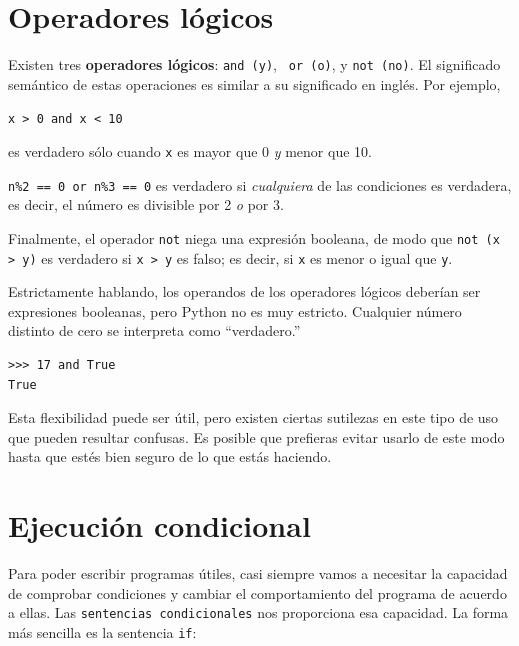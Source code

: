 

\section {Operadores lógicos}

Existen tres {\bf operadores lógicos}: {\tt and (y)}, {\tt
or (o)}, y {\tt not (no)}. El significado semántico de estas operaciones
es similar a su significado en inglés. Por ejemplo, 

{\tt x > 0 and x < 10} 

es verdadero sólo cuando {\tt x} es mayor que 0
\emph{y} menor que 10.


{\tt n\%2 == 0 or n\%3 == 0} es verdadero si \emph{cualquiera} de las condiciones
es verdadera, es decir, el número es divisible por 2 \emph{o} por 3.

Finalmente, el operador {\tt not} niega una expresión
booleana, de modo que {\tt not (x > y)} es verdadero si {\tt x > y} es falso;
es decir, si {\tt x} es menor o igual que {\tt y}.

Estrictamente hablando, los operandos de los operadores lógicos deberían ser
expresiones booleanas, pero Python no es muy estricto.
Cualquier número distinto de cero se interpreta como ``verdadero.''

\beforeverb
\begin{verbatim}
>>> 17 and True
True
\end{verbatim}
\afterverb
%
Esta flexibilidad puede ser útil, pero existen ciertas sutilezas en este tipo de uso
que pueden resultar confusas. Es posible que prefieras evitar usarlo de este modo
hasta que estés bien seguro de lo que estás haciendo.

\section{Ejecución condicional}
\label{conditional execution}


Para poder escribir programas útiles, casi siempre vamos a necesitar
la capacidad de comprobar condiciones y cambiar el comportamiento del programa
de acuerdo a ellas. Las {\tt sentencias condicionales} nos proporciona esa capacidad.
La forma más sencilla es la sentencia {\tt if}:

